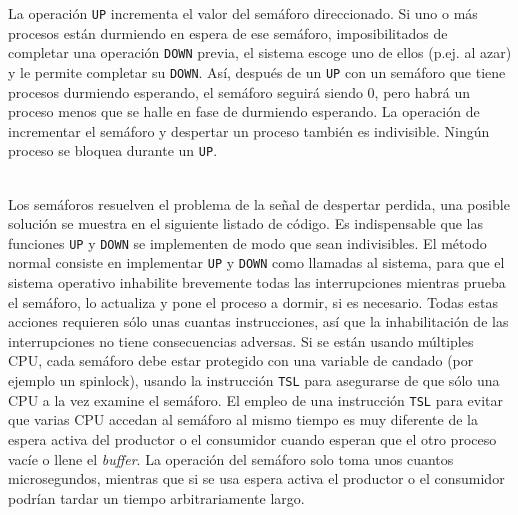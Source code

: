 \documentclass{article}
\begin{document}
La operaci\'on {\tt UP} incrementa el valor del sem\'aforo direccionado. Si uno 
o m\'as procesos est\'an durmiendo en espera de ese sem\'aforo, imposibilitados 
de completar una operaci\'on {\tt DOWN} previa, el sistema escoge uno de 
ellos (p.ej. al azar) y le permite completar su {\tt DOWN}. As\'i, despu\'es de 
un {\tt UP} con un sem\'aforo que tiene procesos durmiendo esperando, el 
sem\'aforo seguir\'a siendo 0, pero habr\'a un proceso menos que se halle 
en fase de durmiendo esperando. La operaci\'on de incrementar el sem\'aforo 
y despertar un proceso tambi\'en es indivisible. Ning\'un proceso se bloquea 
durante un {\tt UP}.

\\
Los sem\'aforos resuelven el problema de la se\~nal de despertar perdida, una 
posible soluci\'on se muestra en el siguiente listado de c\'odigo. Es indispensable 
que las funciones {\tt UP} y {\tt DOWN} se implementen de modo que sean indivisibles. 
El m\'etodo normal consiste en implementar {\tt UP} y {\tt DOWN} como llamadas al 
sistema, para que el sistema operativo inhabilite brevemente todas las interrupciones 
mientras prueba el sem\'aforo, lo actualiza y pone el proceso a dormir, si es necesario. 
Todas estas acciones requieren s\'olo unas cuantas instrucciones, as\'i que la 
inhabilitaci\'on de las interrupciones no tiene consecuencias adversas. Si se est\'an 
usando m\'ultiples CPU, cada sem\'aforo debe estar protegido con una variable de 
candado (por ejemplo un spinlock), usando la instrucci\'on {\tt TSL} para asegurarse 
de que s\'olo una CPU a la vez examine el sem\'aforo. El empleo de una instrucci\'on 
{\tt TSL} para evitar que varias CPU accedan al sem\'aforo al mismo tiempo es muy 
diferente de la espera activa del productor o el consumidor cuando esperan que el 
otro proceso vac\'ie o llene el {\it buffer}. La operaci\'on del sem\'aforo solo toma 
unos cuantos microsegundos, mientras que si se usa espera activa el productor o el 
consumidor podr\'ian tardar un tiempo arbitrariamente largo.
\end{document}

